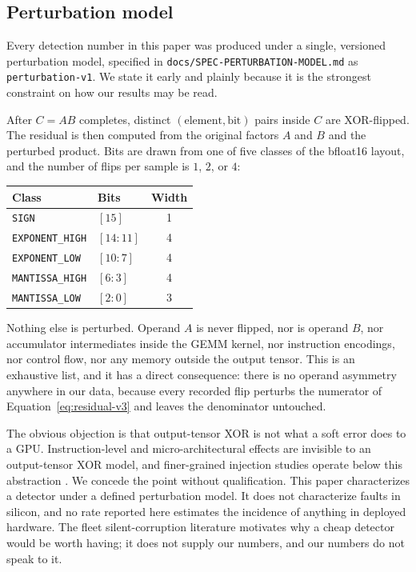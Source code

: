 \subsection{Perturbation model}
\label{sec:method:perturbation}

Every detection number in this paper was produced under a single, versioned
perturbation model, specified in \texttt{docs/SPEC-PERTURBATION-MODEL.md} as
\texttt{perturbation-v1}. We state it early and plainly because it is the
strongest constraint on how our results may be read.

After $C = AB$ completes, distinct $(\text{element}, \text{bit})$ pairs inside
$C$ are XOR-flipped. The residual is then computed from the original factors
$A$ and $B$ and the perturbed product. Bits are drawn from one of five classes
of the bfloat16 layout, and the number of flips per sample is $1$, $2$, or $4$:

\begin{center}
\begin{tabular}{llc}
\toprule
Class & Bits & Width \\
\midrule
\texttt{SIGN}           & $[15]$    & 1 \\
\texttt{EXPONENT\_HIGH} & $[14{:}11]$ & 4 \\
\texttt{EXPONENT\_LOW}  & $[10{:}7]$  & 4 \\
\texttt{MANTISSA\_HIGH} & $[6{:}3]$   & 4 \\
\texttt{MANTISSA\_LOW}  & $[2{:}0]$   & 3 \\
\bottomrule
\end{tabular}
\end{center}

Nothing else is perturbed. Operand $A$ is never flipped, nor is operand $B$,
nor accumulator intermediates inside the GEMM kernel, nor instruction
encodings, nor control flow, nor any memory outside the output tensor. This is
an exhaustive list, and it has a direct consequence: there is no operand
asymmetry anywhere in our data, because every recorded flip perturbs the
numerator of Equation~\ref{eq:residual-v3} and leaves the denominator
untouched.

The obvious objection is that output-tensor XOR is not what a soft error does
to a GPU. Instruction-level and micro-architectural effects are invisible to an
output-tensor XOR model, and finer-grained injection studies operate below this
abstraction \citep{chai2026llm}. We concede the point
without qualification. This paper characterizes a detector under a defined
perturbation model. It does not characterize faults in silicon, and no rate
reported here estimates the incidence of anything in deployed hardware. The
fleet silent-corruption literature \citep{hochschild2021cores,dixit2021silent}
motivates why a cheap detector would be worth having; it does not supply our
numbers, and our numbers do not speak to it.

